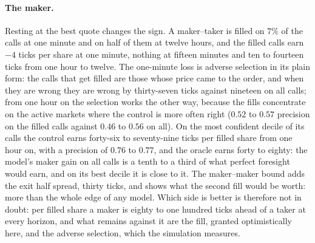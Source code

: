 \paragraph{The maker.}  Resting at the best quote changes the sign.  A maker--taker is
filled on $7\%$ of the calls at one minute and on half of them at twelve hours, and the
filled calls earn $-4$ ticks per share at one minute, nothing at fifteen minutes and ten to
fourteen ticks from one hour to twelve.
The one-minute loss is adverse selection in its plain form: the calls that get filled are
those whose price came to the order, and when they are wrong they are wrong by thirty-seven
ticks against nineteen on all calls; from one hour on the selection works the other way,
because the fills concentrate on the active markets where the control is more often right
($0.52$ to $0.57$ precision on the filled calls against $0.46$ to $0.56$ on all).  On the
most confident decile of its calls the control earns forty-six to seventy-nine ticks per
filled share from one hour on, with a precision of $0.76$ to $0.77$, and the oracle earns
forty to eighty: the model's maker gain on all calls is a tenth to a third of what perfect
foresight would earn, and on its best decile it is close to it.  The maker--maker bound adds
the exit half spread, thirty ticks, and shows what the second fill would be worth: more than
the whole edge of any model.  Which side is better is therefore not in doubt: per filled
share a maker is eighty to one hundred ticks ahead of a taker at every horizon, and what
remains against it are the fill, granted optimistically here, and the adverse selection,
which the simulation measures.

